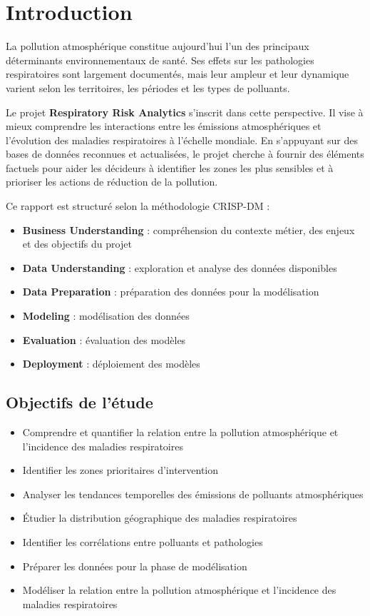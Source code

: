 \documentclass[11pt,a4paper]{article}
\begin{document}
\section*{Introduction}

La pollution atmosphérique constitue aujourd'hui l'un des principaux déterminants environnementaux de santé. Ses effets sur les pathologies respiratoires sont largement documentés, mais leur ampleur et leur dynamique varient selon les territoires, les périodes et les types de polluants.

Le projet \textbf{Respiratory Risk Analytics} s'inscrit dans cette perspective. Il vise à mieux comprendre les interactions entre les émissions atmosphériques et l'évolution des maladies respiratoires à l'échelle mondiale. En s'appuyant sur des bases de données reconnues et actualisées, le projet cherche à fournir des éléments factuels pour aider les décideurs à identifier les zones les plus sensibles et à prioriser les actions de réduction de la pollution.

Ce rapport est structuré selon la méthodologie CRISP-DM :
\begin{itemize}[noitemsep]
    \item \textbf{Business Understanding} : compréhension du contexte métier, des enjeux et des objectifs du projet
    \item \textbf{Data Understanding} : exploration et analyse des données disponibles
    \item \textbf{Data Preparation} : préparation des données pour la modélisation
    \item \textbf{Modeling} : modélisation des données
    \item \textbf{Evaluation} : évaluation des modèles
    \item \textbf{Deployment} : déploiement des modèles
\end{itemize}

\subsection*{Objectifs de l'étude}

\begin{itemize}[noitemsep]
    \item Comprendre et quantifier la relation entre la pollution atmosphérique et l'incidence des maladies respiratoires
    \item Identifier les zones prioritaires d'intervention
    \item Analyser les tendances temporelles des émissions de polluants atmosphériques
    \item Étudier la distribution géographique des maladies respiratoires
    \item Identifier les corrélations entre polluants et pathologies
    \item Préparer les données pour la phase de modélisation
    \item Modéliser la relation entre la pollution atmosphérique et l'incidence des maladies respiratoires
\end{itemize}
\end{document}
